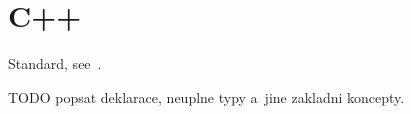 \documentclass{fithesis3}
\begin{document}












%

\section{C++}

Standard, see~\cite{n4296}.

\ifshowoldstuff


TODO popsat deklarace, neuplne typy a~jine zakladni koncepty.
\end{document}
